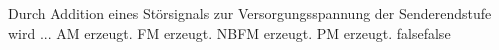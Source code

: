     {Durch Addition eines Störsignals zur Versorgungsspannung der Senderendstufe wird ...}
    {AM erzeugt.}
    {FM erzeugt.}
    {NBFM erzeugt.}
    {PM erzeugt.}
    {false}{false}